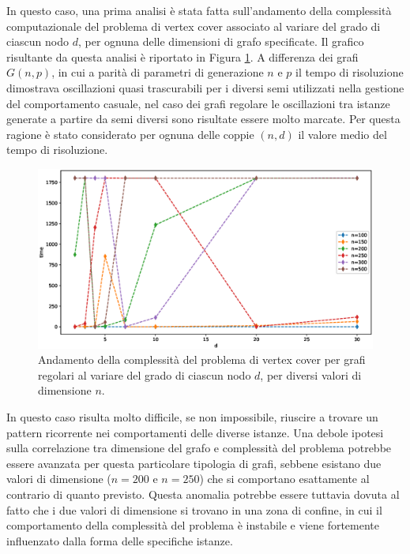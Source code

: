 In questo caso, una prima analisi è stata fatta sull'andamento della complessità computazionale del problema di vertex cover associato al variare del grado di ciascun nodo $d$, per ognuna delle dimensioni di grafo specificate. Il grafico risultante da questa analisi è riportato in Figura \ref{fig:rrgd}. A differenza dei grafi $G(n,p)$, in cui a parità di parametri di generazione $n$ e $p$ il tempo di risoluzione dimostrava oscillazioni quasi trascurabili per i diversi semi utilizzati nella gestione del comportamento casuale, nel caso dei grafi regolare le oscillazioni tra istanze generate a partire da semi diversi sono risultate essere molto marcate. Per questa ragione è stato considerato per ognuna delle coppie $(n,d)$ il valore medio del tempo di risoluzione. 
\vspace{-0.6cm}
\begin{figure}[h!]
     \centering
       \includegraphics[scale=0.5]{images/rrg-d.eps}
       \vspace{-0.3cm}
       \caption{Andamento della complessità del problema di vertex cover per grafi regolari al variare del grado di ciascun nodo $d$, per diversi valori di dimensione $n$.}
        \label{fig:rrgd}
\end{figure}

\vspace{-0.3cm}
In questo caso risulta molto difficile, se non impossibile, riuscire a trovare un pattern ricorrente nei comportamenti delle diverse istanze. Una debole ipotesi sulla correlazione tra dimensione del grafo e complessità del problema potrebbe essere avanzata per questa particolare tipologia di grafi, sebbene esistano due valori di dimensione ($n=200$ e $n=250$) che si comportano esattamente al contrario di quanto previsto. Questa anomalia potrebbe essere tuttavia dovuta al fatto che i due valori di dimensione si trovano in una zona di confine, in cui il comportamento della complessità del problema è instabile e viene fortemente influenzato dalla forma delle specifiche istanze.

